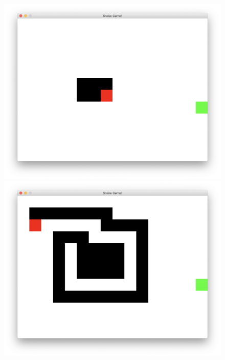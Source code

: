 \documentclass[a4paper]{article}
\begin{document}
\begin{figure}[!hbt]
\begin{minipage}{0.16\textwidth}
    \centering
    \includegraphics[width=\linewidth]{assets/lp1.png}
\end{minipage}\hfill
\begin{minipage}{0.16\textwidth}
    \centering
    \includegraphics[width=\linewidth]{assets/lp2.png}
\end{minipage}
\begin{minipage}{0.16\textwidth}
    \centering

\end{minipage}
\end{figure}
\end{document}
